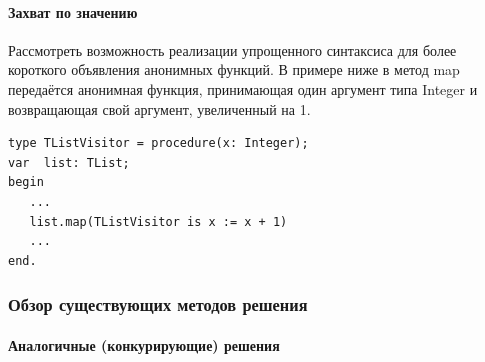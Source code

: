 \documentclass{imcs}
\begin{document}

\paragraph{Захват по значению}
Рассмотреть возможность реализации упрощенного синтаксиса для более короткого объявления
анонимных функций. В примере ниже в метод map передаётся анонимная функция, принимающая
один аргумент типа Integer и возвращающая свой аргумент, увеличенный на 1.
\begin{lstlisting}
type TListVisitor = procedure(x: Integer);
var  list: TList;
begin
   ...
   list.map(TListVisitor is x := x + 1)
   ...
end.
\end{lstlisting}

\subsubsection{Обзор существующих методов решения}

\paragraph{Аналогичные (конкурирующие) решения}

~~~
\end{document}
